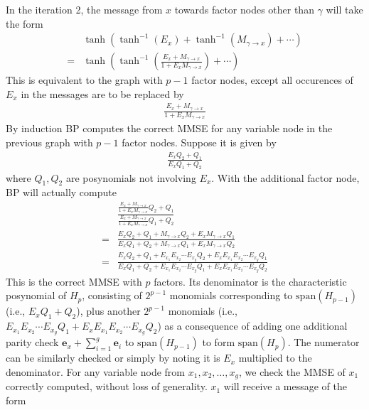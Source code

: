 \documentclass[12pt]{article}
\newcommand{\vect}[1]{\mathbf{#1}}
\begin{document}
In the iteration 2, the message from $x$ towards factor nodes other than $\gamma$ will take the form
\begin{align*}
&\tanh\left(\tanh^{-1}(E_x) + \tanh^{-1}(M_{\gamma\rightarrow x})+\cdots \right)\\
=&\tanh\left(\tanh^{-1}\left(\frac{E_x + M_{\gamma\rightarrow x}}{1+E_xM_{\gamma\rightarrow x}}\right)+\cdots\right)
\end{align*}
This is equivalent to the graph with $p-1$ factor nodes, except all occurences of $E_x$ in the messages are to be replaced by
\begin{align*}
\frac{E_x + M_{\gamma\rightarrow x}}{1+E_xM_{\gamma\rightarrow x}}
\end{align*}
By induction BP computes the correct MMSE for any variable node in the previous graph with $p-1$ factor nodes. Suppose it is given by
\begin{align*}
\frac{E_xQ_2+Q_1}{E_xQ_1+Q_2}
\end{align*}
where $Q_1, Q_2$ are posynomials not involving $E_x$. With the additional factor node, BP will actually compute
\begin{align*}
&\frac{\frac{E_x + M_{\gamma\rightarrow x}}{1+E_xM_{\gamma\rightarrow x}}Q_2+Q_1}{\frac{E_x + M_{\gamma\rightarrow x}}{1+E_xM_{\gamma\rightarrow x}}Q_1+Q_2}\\
=&\frac{E_xQ_2+Q_1+M_{\gamma\rightarrow x}Q_2 + E_xM_{\gamma\rightarrow x}Q_1}{E_xQ_1+Q_2+M_{\gamma\rightarrow x}Q_1 + E_xM_{\gamma\rightarrow x}Q_2}\\
=&\frac{E_xQ_2+Q_1+E_{x_1}E_{x_2}\cdots E_{x_g}Q_2 + E_xE_{x_1}E_{x_2}\cdots E_{x_g}Q_1}{E_xQ_1+Q_2+E_{x_1}E_{x_2}\cdots E_{x_g}Q_1 + E_xE_{x_1}E_{x_2}\cdots E_{x_g}Q_2}
\end{align*}
This is the correct MMSE with $p$ factors. Its denominator is the characteristic posynomial of $H_p$, consisting of $2^{p-1}$ monomials corresponding to $\mathrm{span}(H_{p-1})$ (i.e., $E_xQ_1+Q_2$), plus another $2^{p-1}$ monomials (i.e., $E_{x_1}E_{x_2}\cdots E_{x_g}Q_1 + E_xE_{x_1}E_{x_2}\cdots E_{x_g}Q_2$) as a consequence of adding one additional parity check $\vect{e}_x+\sum_{i=1}^g\vect{e}_i$ to $\mathrm{span}(H_{p-1})$ to form $\mathrm{span}(H_p)$. The numerator can be similarly checked or simply by noting it is $E_x$ multiplied to the denominator. For any variable node from $x_1, x_2, \ldots, x_g$, we check the MMSE of $x_1$ correctly computed, without loss of generality. $x_1$ will receive a message of the form
\end{document}
